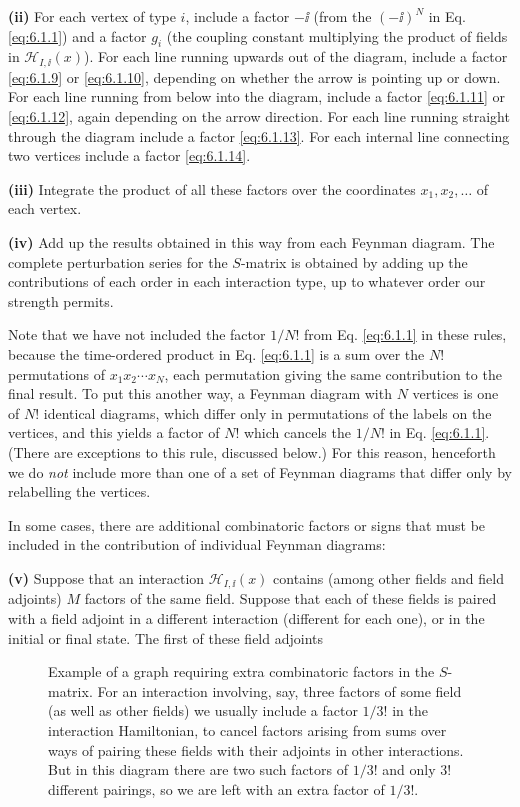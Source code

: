 \noindent\textbf{(ii)} For each vertex of type $i$, include a factor $-\ii$
(from the $(-\ii)^N$ in Eq. \eqref{eq:6.1.1}) and a factor $g_i$ (the coupling constant
multiplying the product of fields in $\mathcal H_{I,\ii}(x)$). For each line
running upwards out of the diagram, include a factor \eqref{eq:6.1.9} or \eqref{eq:6.1.10},
depending on whether the arrow is pointing up or down. For each line running
from below into the diagram, include a factor \eqref{eq:6.1.11} or \eqref{eq:6.1.12}, again
depending on the arrow direction. For each line running straight through the
diagram include a factor \eqref{eq:6.1.13}. For each internal line connecting two
vertices include a factor \eqref{eq:6.1.14}.

\noindent\textbf{(iii)} Integrate the product of all these factors over the
coordinates $x_1,x_2,\ldots$ of each vertex.

\noindent\textbf{(iv)} Add up the results obtained in this way from each
Feynman diagram. The complete perturbation series for the $S$-matrix is
obtained by adding up the contributions of each order in each interaction
type, up to whatever order our strength permits.

Note that we have not included the factor $1/N!$ from Eq. \eqref{eq:6.1.1} in these
rules, because the time-ordered product in Eq. \eqref{eq:6.1.1} is a sum over the $N!$
permutations of $x_1x_2\cdots x_N$, each permutation giving the same
contribution to the final result. To put this another way, a Feynman diagram
with $N$ vertices is one of $N!$ identical diagrams, which differ only in
permutations of the labels on the vertices, and this yields a factor of $N!$
which cancels the $1/N!$ in Eq. \eqref{eq:6.1.1}. (There are exceptions to this rule,
discussed below.) For this reason, henceforth we do \emph{not} include more
than one of a set of Feynman diagrams that differ only by relabelling the
vertices.

In some cases, there are additional combinatoric factors or signs that must be
included in the contribution of individual Feynman diagrams:

\noindent\textbf{(v)} Suppose that an interaction $\mathcal H_{I,\ii}(x)$
contains (among other fields and field adjoints) $M$ factors of the same field.
Suppose that each of these fields is paired with a field adjoint in a different
interaction (different for each one), or in the initial or final state. The
first of these field adjoints
\begingroup
\renewcommand{\thefigure}{6.\arabic{figure}}
\setcounter{figure}{1}
\begin{figure}[htbp]

\caption{Example of a graph requiring extra combinatoric factors in the
$S$-matrix. For an interaction involving, say, three factors of some field (as
well as other fields) we usually include a factor $1/3!$ in the interaction
Hamiltonian, to cancel factors arising from sums over ways of pairing these
fields with their adjoints in other interactions. But in this diagram there
are two such factors of $1/3!$ and only $3!$ different pairings, so we are left
with an extra factor of $1/3!$.}
\label{fig:6.2}
\end{figure}
\endgroup

